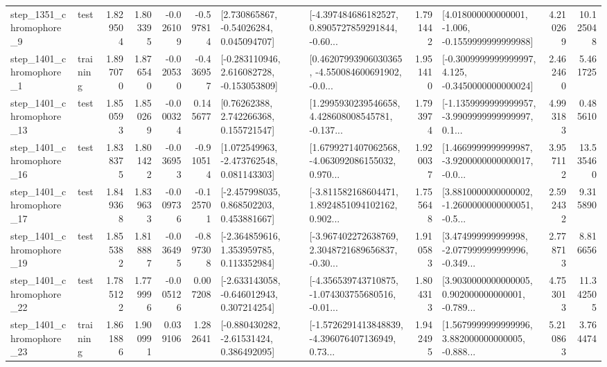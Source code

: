 \begin{tabular}{llrrrrllrlrr}
  step\_1351\_chromophore\_9 &      test &      1.829504 &    1.803395 &     -0.026109 & -0.597814 &     [2.730865867, -0.54026284, 0.045094707] &  [-4.397484686182527, 0.8905727859291844, -0.60... &       1.791442 &   [4.018000000000001, -1.006, -0.1559999999999988] &            4.210269 &         10.125048 \\
  step\_1401\_chromophore\_1 &  training &      1.897070 &    1.876540 &     -0.020530 & -0.436957 &   [-0.283110946, 2.616082728, -0.153053809] &  [0.46207993906030365, -4.550084600691902, -0.0... &       1.951410 &  [-0.3009999999999997, 4.125, -0.3450000000000024] &            2.462460 &          5.461725 \\
 step\_1401\_chromophore\_13 &      test &      1.850593 &    1.850269 &     -0.000324 &  0.145677 &      [0.76262388, 2.742266368, 0.155721547] &  [1.2995930239546658, 4.428608008545781, -0.137... &       1.793974 &  [-1.1359999999999957, -3.9909999999999997, 0.1... &            4.993183 &          0.485610 \\
 step\_1401\_chromophore\_16 &      test &      1.838375 &    1.801422 &     -0.036953 & -0.910514 &    [1.072549963, -2.473762548, 0.081143303] &  [1.6799271407062568, -4.063092086155032, 0.970... &       1.920037 &  [1.4669999999999987, -3.9200000000000017, -0.0... &            3.957112 &         13.535460 \\
 step\_1401\_chromophore\_17 &      test &      1.849368 &    1.839633 &     -0.009736 & -0.125701 &    [-2.457998035, 0.868502203, 0.453881667] &  [-3.811582168604471, 1.8924851094102162, 0.902... &       1.755648 &  [3.8810000000000002, -1.2600000000000051, -0.5... &            2.592432 &          9.315890 \\
 step\_1401\_chromophore\_19 &      test &      1.855382 &    1.818887 &     -0.036495 & -0.897308 &    [-2.364859616, 1.353959785, 0.113352984] &  [-3.967402272638769, 2.3048721689656837, -0.30... &       1.910583 &  [3.474999999999998, -2.077999999999996, -0.349... &            2.778713 &          8.816656 \\
 step\_1401\_chromophore\_22 &      test &      1.785122 &    1.779996 &     -0.005126 &  0.007208 &   [-2.633143058, -0.646012943, 0.307214254] &  [-4.356539743710875, -1.074303755680516, -0.01... &       1.804313 &  [3.9030000000000005, 0.902000000000001, -0.789... &            4.753013 &         11.342505 \\
 step\_1401\_chromophore\_23 &  training &      1.861886 &    1.900991 &      0.039106 &  1.282641 &    [-0.880430282, -2.61531424, 0.386492095] &  [-1.5726291413848839, -4.396076407136949, 0.73... &       1.942495 &  [1.5679999999999996, 3.882000000000005, -0.888... &            5.210863 &          3.764474 \\

\end{tabular}
